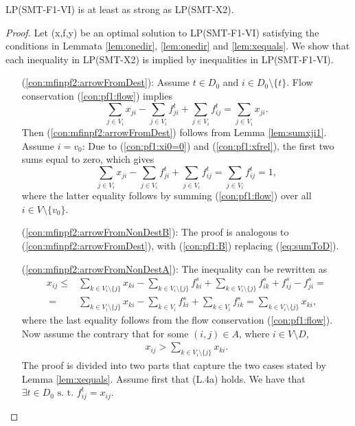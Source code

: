 \begin{prop}
\label{prop:f1strx2}
LP(SMT-F1-VI) is at least as strong as LP(SMT-X2). 
\end{prop}
\begin{proof}
Let (x,f,y) be an optimal solution to LP(SMT-F1-VI) satisfying the conditions in Lemmata \ref{lem:onedir}, \ref{lem:onedir} and \ref{lem:xequals}. We show that each inequality in LP(SMT-X2) is implied by inequalities in LP(SMT-F1-VI).

\begin{itemize}[leftmargin=1cm]
\item[ (\ref{con:mfinpf2:arrowFromDest}):] Assume $t\in D_0$ and $i\in D_0\setminus\{t\}$. Flow conservation (\ref{con:pf1:flow}) implies
$$\sum_{j\in V_i}x_{ji} - \sum_{j\in V_i}f_{ji}^t + \sum_{j\in V_i}f_{ij}^t = \sum_{j\in V_i}x_{ji}.$$ Then (\ref{con:mfinpf2:arrowFromDest}) follows from Lemma \ref{lem:sumxji1}.
Assume $i=v_0$: Due to (\ref{con:pf1:xi0=0}) and (\ref{con:pf1:xfrel}), the first two sums equal to zero, which gives
$$\sum_{j\in V_i}x_{ji} - \sum_{j\in V_i}f_{ji}^t + \sum_{j\in V_i}f_{ij}^t = \sum_{j\in V_i}f_{ij}^t = 1,$$
where the latter equality follows by summing (\ref{con:pf1:flow}) over all $i\in V\setminus\{v_0\}$.
\item[ (\ref{con:mfinpf2:arrowFromNonDestB}):] The proof is analogous to (\ref{con:mfinpf2:arrowFromDest}), with (\ref{con:pf1:B}) replacing (\ref{eq:sumToD}).
\item[ (\ref{con:mfinpf2:arrowFromNonDestA}):] The inequality can be rewritten as
\begin{align*}
 x_{ij}  \leq& \sum\limits_{k \in V_i\setminus\{j\}}x_{ki}-\sum\limits_{k \in V_i\setminus\{j\}}f^s_{ki}+\sum\limits_{k \in V_i\setminus\{j\}}f^s_{ik} +f^s_{ij}-f^s_{ji} = \\
 ~=& \sum\limits_{k \in V_i\setminus\{j\}}x_{ki}-\sum\limits_{k \in V_i}f^s_{ki}+\sum\limits_{k \in V_i}f^s_{ik} = \sum\limits_{k \in V_i\setminus\{j\}}x_{ki},
\end{align*}
where the last equality follows from the flow conservation (\ref{con:pf1:flow}). Now assume the contrary that for some $(i,j)\in A$, where $i\in V\setminus D$,
\begin{align}
x_{ij} > \sum\limits_{k \in V_i\setminus\{j\}}x_{ki}.\label{eq:assumContr}\tag{B}
\end{align}
The proof is divided into two parts that capture the two cases stated by Lemma \ref{lem:xequals}. Assume first that (L.4a) holds. We have that $\exists t\in D_0 \text{ s. t. }f^t_{ij}=x_{ij}$.

\end{itemize}
\end{proof}
